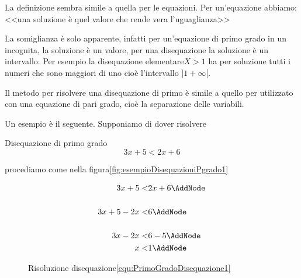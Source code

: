 La definizione sembra simile a quella per le equazioni. Per un'equazione abbiamo: <<una soluzione è quel valore che rende vera l'uguaglianza>>\par
La somiglianza è solo apparente, infatti per un'equazione di primo grado in un incognita, la soluzione è un valore, per una disequazione la soluzione è un intervallo. Per esempio la disequazione elementare$X>1$ ha per soluzione tutti i numeri che sono maggiori di uno cioè l'intervallo $]1 +\infty [$.\par
Il metodo per risolvere una disequazione di primo è simile a quello per utilizzato con una equazione di pari grado, cioè la separazione delle variabili.\par Un esempio è il seguente. Supponiamo di dover risolvere 
\begin{esempiot}{Disequazione di primo grado}{}
\begin{equation}
3x+5<2x+6\label{equ:PrimoGradoDisequazione1}
\end{equation}
\end{esempiot}
 procediamo come nella figura\nobs\vref{fig:esempioDisequazioniPgrado1}
\begin{figure}
	\begin{NodesList}
		\centering
		\begin{align*}
			3x+5<&2x+6\AddNode\\[.5cm] 
			3x+5-2x<&6\AddNode\\[.5cm] %
			3x-2x<&6-5\AddNode\\
			x<&1\AddNode
		\end{align*}
				\end{NodesList}
		\captionsetup{format=esempio,list=no}
	\caption{Risoluzione disequazione\nobs\vref{equ:PrimoGradoDisequazione1}}
	\label{fig:esempioDisequazioniPgrado1}
\end{figure}

